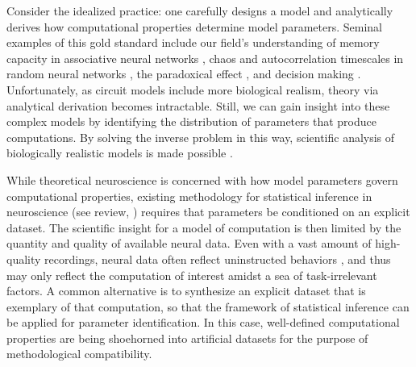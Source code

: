 \documentclass[11pt]{article}
\begin{document}
Consider the idealized practice: one carefully designs a model and analytically derives how computational properties determine model parameters.
Seminal examples of this gold standard include our field's understanding of memory capacity in associative neural networks \cite{hopfield1982neural}, chaos and autocorrelation timescales in random neural networks \cite{sompolinsky1988chaos}, the paradoxical effect \cite{tsodyks1997paradoxical}, and decision making \cite{wong2006recurrent}.
Unfortunately, as circuit models include more biological realism, theory via analytical derivation becomes intractable.
Still, we can gain insight into these complex models by identifying the distribution of parameters that produce computations.
By solving the inverse problem in this way, scientific analysis of biologically realistic models is made possible \cite{foster1993significance, prinz2004similar, achard2006complex, o2014cell, alonso2019visualization}.

While theoretical neuroscience is concerned with how model parameters govern  computational properties, existing methodology for statistical inference in neuroscience \cite{kass2001spike, brown1998statistical, paninski2004maximum, truccolo2005point, schneidman2006weak, druckmann2007novel, turner2007maximum, byron2009gaussian, macke2011empirical, park2011bayesian, granot2013stimulus, latimer2015single, lakshminarasimhan2018dynamic, duncker2019learning, ladenbauer2019inferring, gao2016linear, zhao2017recursive, barello2018sparse, pandarinath2018inferring, wiltschko2015mapping, johnson2016composing, batty2019behavenet} (see review, \cite{paninski2018neural}) requires that parameters be conditioned on an explicit dataset.
The scientific insight for a model of computation is then limited by the quantity and quality of available neural data.
Even with a vast amount of high-quality recordings, neural data often reflect uninstructed behaviors \cite{niell2010modulation, saleem2013integration, musall2019single}, and thus may only reflect the computation of interest amidst a sea of task-irrelevant factors. 
A common alternative is to synthesize an explicit dataset that is exemplary of that computation, so that the framework of statistical inference can be applied for parameter identification.
In this case, well-defined computational properties are being shoehorned into artificial datasets for the purpose of methodological compatibility.
\end{document}
